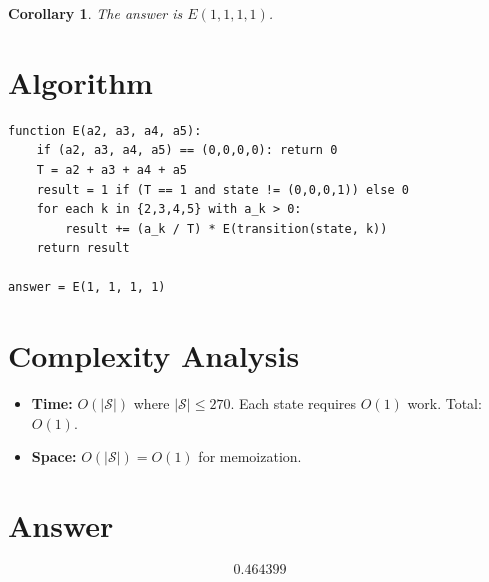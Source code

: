 \documentclass[12pt]{article}
\newtheorem{corollary}[theorem]{Corollary}
\begin{document}
\begin{corollary}
The answer is $E(1,1,1,1)$.
\end{corollary}

\section{Algorithm}

\begin{verbatim}
function E(a2, a3, a4, a5):
    if (a2, a3, a4, a5) == (0,0,0,0): return 0
    T = a2 + a3 + a4 + a5
    result = 1 if (T == 1 and state != (0,0,0,1)) else 0
    for each k in {2,3,4,5} with a_k > 0:
        result += (a_k / T) * E(transition(state, k))
    return result

answer = E(1, 1, 1, 1)
\end{verbatim}

\section{Complexity Analysis}

\begin{itemize}
    \item \textbf{Time:} $O(|\mathcal{S}|)$ where $|\mathcal{S}| \le 270$. Each state requires $O(1)$ work. Total: $O(1)$.
    \item \textbf{Space:} $O(|\mathcal{S}|) = O(1)$ for memoization.
\end{itemize}

\section{Answer}

\[
\boxed{0.464399}
\]
\end{document}
